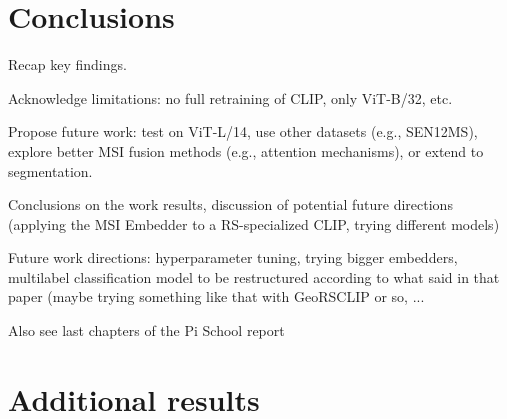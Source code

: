 \documentclass[a4paper, oneside, english]{sapthesis} %
\begin{document}
\chapter{Conclusions} %

Recap key findings.

Acknowledge limitations: no full retraining of CLIP, only ViT-B/32, etc.

Propose future work: test on ViT-L/14, use other datasets (e.g., SEN12MS), explore better MSI fusion methods (e.g., attention mechanisms), or extend to segmentation.

Conclusions on the work results, discussion of potential future directions (applying the MSI Embedder to a RS-specialized CLIP, trying different models)

Future work directions: hyperparameter tuning, trying bigger embedders, multilabel classification model to be restructured according to what said in that paper (maybe trying something like that with GeoRSCLIP or so, ...

Also see last chapters of the Pi School report



\cleardoublepage

\appendix
\chapter{Additional results}
\end{document}
